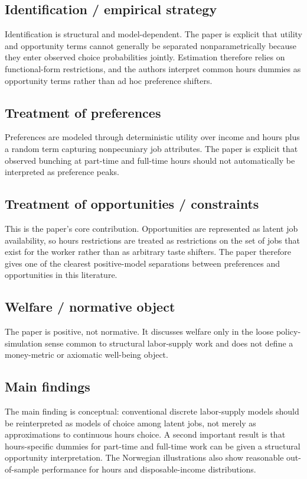 \documentclass[11pt,a4paper]{article}
\begin{document}
\subsection*{Identification / empirical strategy}
Identification is structural and model-dependent. The paper is explicit that utility and opportunity terms cannot generally be separated nonparametrically because they enter observed choice probabilities jointly. Estimation therefore relies on functional-form restrictions, and the authors interpret common hours dummies as opportunity terms rather than ad hoc preference shifters.

\subsection*{Treatment of preferences}
Preferences are modeled through deterministic utility over income and hours plus a random term capturing nonpecuniary job attributes. The paper is explicit that observed bunching at part-time and full-time hours should not automatically be interpreted as preference peaks.

\subsection*{Treatment of opportunities / constraints}
This is the paper’s core contribution. Opportunities are represented as latent job availability, so hours restrictions are treated as restrictions on the set of jobs that exist for the worker rather than as arbitrary taste shifters. The paper therefore gives one of the clearest positive-model separations between preferences and opportunities in this literature.

\subsection*{Welfare / normative object}
The paper is positive, not normative. It discusses welfare only in the loose policy-simulation sense common to structural labor-supply work and does not define a money-metric or axiomatic well-being object.

\subsection*{Main findings}
The main finding is conceptual: conventional discrete labor-supply models should be reinterpreted as models of choice among latent jobs, not merely as approximations to continuous hours choice. A second important result is that hours-specific dummies for part-time and full-time work can be given a structural opportunity interpretation. The Norwegian illustrations also show reasonable out-of-sample performance for hours and disposable-income distributions.
\end{document}
